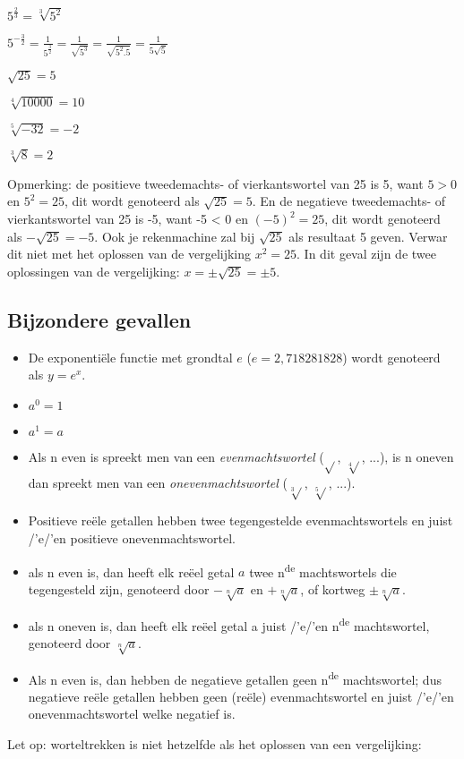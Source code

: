 ${\displaystyle 5^{\frac{2}{3}}=\sqrt[3]{5^{2}}}$

${\displaystyle 5^{-\frac{3}{2}}=\frac{1}{5^{\frac{3}{2}}}=\frac{1}{\sqrt{5^{3}}}=\frac{1}{\sqrt{5^{2}.5}}=\frac{1}{5\sqrt{5}}}$

${\displaystyle \sqrt{25}=5}$ 

${\displaystyle \sqrt[4]{10000}=10}$

${\displaystyle \sqrt[5]{-32}=-2}$

${\displaystyle \sqrt[3]{8}=2}$

Opmerking: de positieve tweedemachts- of vierkantswortel van 25 is
5, want $5>0$ en $5^{2}=25$, dit wordt genoteerd als ${\displaystyle \sqrt{25}=5}$.
En de negatieve tweedemachts- of vierkantswortel van 25 is -5, want
-5 < 0 en $(-5)^{2}=25$, dit wordt genoteerd als ${\displaystyle -\sqrt{25}=-5}$.
Ook je rekenmachine zal bij ${\displaystyle \sqrt{25}}$ als resultaat
5 geven. Verwar dit niet met het oplossen van de vergelijking $x^{2}=25$.
In dit geval zijn de twee oplossingen van de vergelijking: $x=\pm\sqrt{25}=\pm5$.


\subsection{Bijzondere gevallen}
\begin{itemize}
\item De exponenti\"ele functie met grondtal $e$ ($e=2,718281828$) wordt
genoteerd als ${\displaystyle y=e^{x}}$.
\item ${\displaystyle a^{0}=1}$
\item ${\displaystyle a^{1}=a}$
\item Als n even is spreekt men van een \emph{evenmachtswortel} ($\sqrt{}$,
$\sqrt[4]{}$, ...), is n oneven dan spreekt men van een \emph{onevenmachtswortel}
($\sqrt[3]{}$, $\sqrt[5]{}$, ...).
\item Positieve re\"ele getallen hebben twee tegengestelde evenmachtswortels
en juist /'e/'en positieve onevenmachtswortel.
\item als n even is, dan heeft elk re\"eel getal $a$ twee n\textsuperscript{de}
machtswortels die tegengesteld zijn, genoteerd door ${\displaystyle -\sqrt[n]{a}}$
en ${\displaystyle +\sqrt[n]{a}}$, of kortweg ${\displaystyle \pm\sqrt[n]{a}}$.
\item als n oneven is, dan heeft elk re\"eel getal a juist /'e/'en n\textsuperscript{de}
machtswortel, genoteerd door ${\displaystyle \sqrt[n]{a}}$.
\item Als n even is, dan hebben de negatieve getallen geen n\textsuperscript{de}
machtswortel; dus negatieve re\"ele getallen hebben geen (re\"ele) evenmachtswortel
en juist /'e/'en onevenmachtswortel welke negatief is.
\end{itemize}
Let op: worteltrekken is niet hetzelfde als het oplossen van een vergelijking:

